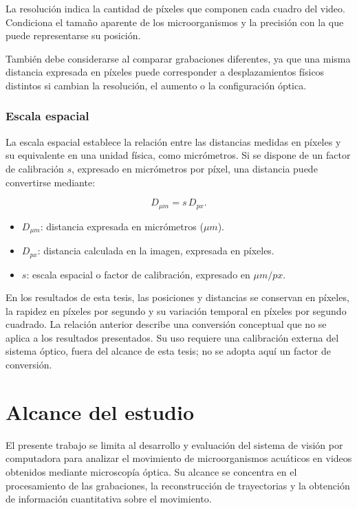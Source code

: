 La resolución indica la cantidad de píxeles que componen cada cuadro del video. Condiciona el tamaño aparente de los microorganismos y la precisión con la que puede representarse su posición.

También debe considerarse al comparar grabaciones diferentes, ya que una misma distancia expresada en píxeles puede corresponder a desplazamientos físicos distintos si cambian la resolución, el aumento o la configuración óptica.

\subsubsection{Escala espacial}

La escala espacial establece la relación entre las distancias medidas en píxeles y su equivalente en una unidad física, como micrómetros. Si se dispone de un factor de calibración $s$, expresado en micrómetros por píxel, una distancia puede convertirse mediante:

\[
D_{\mu m}=s\,D_{px}.
\]

\begin{itemize}
  \item $D_{\mu m}$: distancia expresada en micrómetros ($\mu m$).
\end{itemize}

\begin{itemize}
  \item $D_{px}$: distancia calculada en la imagen, expresada en píxeles.
\end{itemize}

\begin{itemize}
  \item $s$: escala espacial o factor de calibración, expresado en $\mu m/px$.
\end{itemize}

En los resultados de esta tesis, las posiciones y distancias se conservan en píxeles, la rapidez en píxeles por segundo y su variación temporal en píxeles por segundo cuadrado. La relación anterior describe una conversión conceptual que no se aplica a los resultados presentados. Su uso requiere una calibración externa del sistema óptico, fuera del alcance de esta tesis; no se adopta aquí un factor de conversión.

\section{Alcance del estudio}

El presente trabajo se limita al desarrollo y evaluación del sistema de visión por computadora para analizar el movimiento de microorganismos acuáticos en videos obtenidos mediante microscopía óptica. Su alcance se concentra en el procesamiento de las grabaciones, la reconstrucción de trayectorias y la obtención de información cuantitativa sobre el movimiento.

